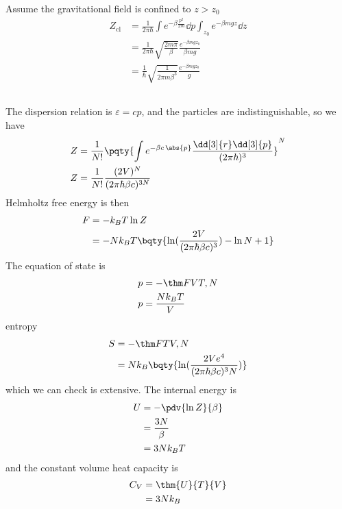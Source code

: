 \documentclass[12pt]{article}
\begin{document}
        \subsubsection{} Assume the gravitational field is confined to \(z> z_0\)\begin{align*}
            Z_\text{cl}
            &= \frac{1}{2\pi\hbar} \int e^{-\beta \frac{p^2}{2m}} \dd{p} \int_{z_0} e^{-\beta mgz }  \dd{z}\\
            &= \frac{1}{2\pi\hbar} \sqrt{\frac{2m\pi}{\beta }} \frac{e^{-\beta mg z_0}}{\beta mg}\\
            &= \frac{1}{\hbar} \sqrt{\frac{1}{2\pi m\beta^3 }} \frac{e^{-\beta mg z_0}}{g}
        \end{align*}
        \subsection{} \subsubsection{} The dispersion relation is \( \varepsilon = cp\), and the particles are indistinguishable, so we have \begin{align*}
            Z &= \frac{1}{N!} \pqty{\int e^{ - \beta c\,  \abs{p}}\frac{\dd[3]{r} \dd[3]{p}}{(2\pi\hbar)^3}}^N\\
            Z &= \frac{1}{N!} {\frac{(2V)^{N}}{( 2\pi\hbar\beta c)^{3N}}}
        \end{align*}
        Helmholtz free energy is then \begin{align*}
            F &= - k_BT \ln Z\\
            &= - N k_BT \bqty{ \ln(\frac{2V}{( 2\pi \hbar\beta c)^3}) -\ln N  + 1}
        \end{align*}
        The equation of state is \begin{align*}
            p &= -\thm FV{T,N}\\
            p &= \frac{Nk_BT}{V}
        \end{align*}
        entropy \begin{align*}
            S &= -\thm FT{V,N}\\
            &= Nk_B\bqty{ \ln(\frac{2V e^4}{( 2\pi \hbar\beta c)^3N})}
        \end{align*}
        which we can check is extensive.
        The internal energy is \begin{align*}
            U &= -\pdv{\ln Z}{\beta }\\
            &= \frac{3N}{\beta }\\
            &= 3N k_BT
        \end{align*}
        and the constant volume heat capacity is \begin{align*}
            C_V &= \thm{U}{T}{V}\\
            &= 3Nk_B    
        \end{align*}
\end{document}
